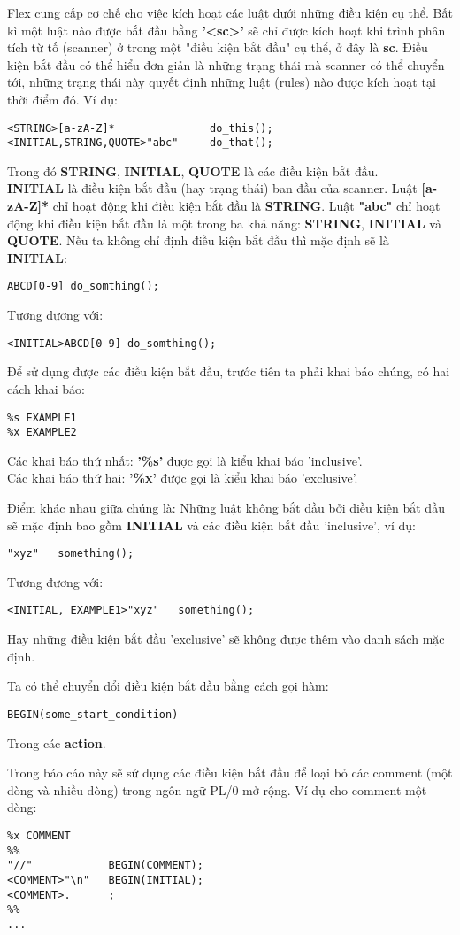 \documentclass[../report.tex]{subfiles}
\begin{document}
Flex cung cấp cơ chế cho việc kích hoạt các luật dưới những điều kiện cụ thể. 
Bất kì một luật nào được bắt đầu bằng \textbf{'<sc>'} sẽ chỉ được 
kích hoạt khi trình phân tích từ tố (scanner) ở trong 
một "điều kiện bắt đầu" cụ thể, ở đây là \textbf{sc}. 
Điều kiện bắt đầu
có thể hiểu đơn giản là những 
trạng thái mà scanner có thể chuyển tới, 
những trạng thái này quyết định những luật (rules) nào được kích hoạt 
tại thời điểm đó.
Ví dụ: 
\begin{lstlisting}
<STRING>[a-zA-Z]*               do_this();
<INITIAL,STRING,QUOTE>"abc"     do_that();
\end{lstlisting}
Trong đó 
\textbf{STRING},
\textbf{INITIAL},
\textbf{QUOTE}
là các điều kiện bắt đầu. \\
\textbf{INITIAL} là điều kiện bắt đầu (hay trạng thái) 
ban đầu của scanner. Luật \textbf{[a-zA-Z]*} chỉ hoạt động khi 
điều kiện bắt đầu là \textbf{STRING}. Luật 
\textbf{"abc"} chỉ hoạt động khi điều kiện bắt đầu là một 
trong ba khả năng: 
\textbf{STRING},
\textbf{INITIAL} và
\textbf{QUOTE}. 
Nếu ta không chỉ định điều kiện bắt đầu thì mặc định sẽ là 
\textbf{INITIAL}:
\begin{lstlisting}
ABCD[0-9] do_somthing();
\end{lstlisting}
Tương đương với:
\begin{lstlisting}
<INITIAL>ABCD[0-9] do_somthing();
\end{lstlisting}

Để sử dụng được các điều kiện bắt đầu, trước tiên 
ta phải khai báo chúng, có hai cách khai báo: 
\begin{lstlisting}
%s EXAMPLE1
%x EXAMPLE2
\end{lstlisting}
Các khai báo thứ nhất: \textbf{'\%s'} 
được gọi là kiểu khai báo 'inclusive'. \\
Các khai báo thứ hai: \textbf{'\%x'} được gọi là kiểu 
khai báo 'exclusive'.

Điểm khác nhau giữa chúng là: Những luật không bắt đầu bởi điều kiện bắt đầu sẽ mặc định bao gồm
\textbf{INITIAL} và các điều kiện bắt đầu 'inclusive', ví dụ:
\begin{lstlisting}
"xyz"   something();
\end{lstlisting}
Tương đương với:
\begin{lstlisting}
<INITIAL, EXAMPLE1>"xyz"   something();
\end{lstlisting}
Hay những điều kiện bắt đầu 'exclusive' sẽ không được thêm vào 
danh sách mặc định. 

\noindent Ta có thể chuyển đổi điều kiện bắt đầu bằng cách gọi hàm:
\begin{lstlisting}
BEGIN(some_start_condition)
\end{lstlisting}
Trong các \textbf{action}.

Trong báo cáo này sẽ sử dụng các điều kiện bắt đầu để loại bỏ các 
comment (một dòng và nhiều dòng) trong ngôn ngữ PL/0 mở rộng. 
Ví dụ cho comment một dòng:
\begin{lstlisting}
%x COMMENT
%%
"//"            BEGIN(COMMENT);
<COMMENT>"\n"   BEGIN(INITIAL);
<COMMENT>.      ;
%%
...
\end{lstlisting}
\end{document}
